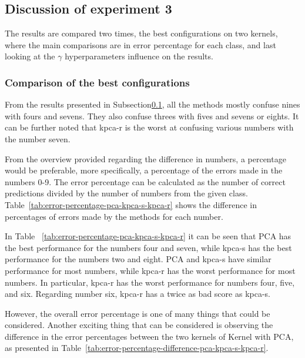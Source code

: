 \subsection{Discussion of experiment 3}\label{subsec:discussion-experiment-3}
The results are compared two times, the best configurations on two kernels, where the main comparisons are in error percentage for each class, and last looking at the $\gamma$ hyperparameters influence on the results.

\subsubsection{Comparison of the best configurations}
From the results presented in Subsection\ref{subsec:discussion-experiment-3}, all the methods mostly confuse nines with fours and sevens. They also confuse threes with fives and sevens or eights. It can be further noted that \gls{kpca-r} is the worst at confusing various numbers with the number seven.



From the overview provided regarding the difference in numbers, a percentage would be preferable, more specifically, a percentage of the errors made in the numbers 0-9. The error percentage can be calculated as the number of correct predictions divided by the number of numbers from the given class. Table~\ref{tab:error-percentage-pca-kpca-s-kpca-r} shows the difference in percentages of errors made by the methods for each number.

In Table ~\ref{tab:error-percentage-pca-kpca-s-kpca-r} it can be seen that PCA has the best performance for the numbers four and seven, while \gls{kpca-s} has the best performance for the numbers two and eight. PCA and \gls{kpca-s} have similar performance for most numbers, while \gls{kpca-r} has the worst performance for most numbers. In particular, \gls{kpca-r} has the worst performance for numbers four, five, and six. Regarding number six, \gls{kpca-r} has a twice as bad score as \gls{kpca-s}.

However, the overall error percentage is one of many things that could be considered. Another exciting thing that can be considered is observing the difference in the error percentages between the two kernels of Kernel with PCA, as presented in Table~\ref{tab:error-percentage-difference-pca-kpca-s-kpca-r}.




